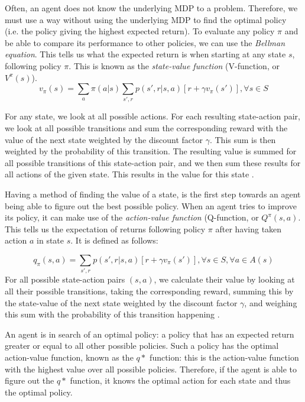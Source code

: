 Often, an agent does not know the underlying MDP to a problem. Therefore, we must use a way without using the underlying MDP to find the optimal policy (i.e. the policy giving the highest expected return). To evaluate any policy ${\pi}$ and be able to compare its performance to other policies, we can use the \emph{Bellman equation}. This tells us what the expected return is when starting at any state $s$, following policy $\pi$. This is known as the \emph{state-value function} (V-function, or $V^{\pi}(s)$).
\begin{equation}
v_\pi (s) = \sum_{a} \pi (a|s) \sum_{s', r} p(s', r|s,a)[r + \gamma v_\pi (s')], \forall s \in S
\end{equation} 

For any state, we look at all possible actions. For each resulting state-action pair, we look at all possible transitions and sum the corresponding reward with the value of the next state weighted by the discount factor $\gamma$. This sum is then weighted by the probability of this transition. The resulting value is summed for all possible transitions of this state-action pair, and we then sum these results for all actions of the given state. This results in the value for this state \cite[p. 73]{grokking}.

Having a method of finding the value of a state, is the first step towards an agent being able to figure out the best possible policy. When an agent tries to improve its policy, it can make use of the \emph{action-value function} (Q-function, or $Q^\pi (s, a)$. This tells us the expectation of returns following policy $\pi$ after having taken action $a$ in state $s$. It is defined as follows:

\begin{equation}
q_\pi (s,a) = \sum_{s', r} p(s', r|s,a)[r + \gamma v_\pi (s')], \forall s \in S, \forall a \in A(s)
\end{equation}
For all possible state-action pairs $(s,a)$, we calculate their value by looking at all their possible transitions, taking the corresponding reward, summing this by the state-value of the next state weighted by the discount factor $\gamma$, and weighing this sum with the probability of this transition happening \cite[p. 74]{grokking}.

An agent is in search of an optimal policy: a policy that has an expected return greater or equal to all other possible policies. Such a policy has the optimal action-value function, known as the $q*$ function: this is the action-value function with the highest value over all possible policies. Therefore, if the agent is able to figure out the $q*$ function, it knows the optimal action for each state and thus the optimal policy. 

